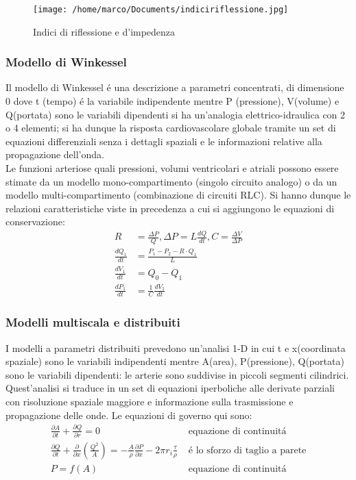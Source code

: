 \documentclass[10pt]{article}
\begin{document}
\begin{figure}[h!]
\centering
\texttt{[image: /home/marco/Documents/indiciriflessione.jpg]}
\caption{Indici di riflessione e d'impedenza}
\label{fig:indiciRIRM}
\end{figure}

\subsubsection{Modello di Winkessel}

Il modello di Winkessel é una descrizione a parametri concentrati, di dimensione 0 dove t (tempo) é la variabile indipendente mentre P (pressione), V(volume) e Q(portata) sono le variabili dipendenti \textrightarrow si ha un'analogia elettrico-idraulica con 2 o 4 elementi; si ha dunque la risposta cardiovascolare globale tramite un set di equazioni differenziali senza i dettagli spaziali e le informazioni relative alla propagazione dell'onda. \\
Le funzioni arteriose quali pressioni, volumi ventricolari e atriali possono essere stimate da un modello mono-compartimento (singolo circuito analogo) o da un modello multi-compartimento (combinazione di circuiti RLC).
Si hanno dunque le relazioni caratteristiche viste in precedenza a cui si aggiungono le equazioni di conservazione:
\begin{align*}
R &=\frac{\Delta P}{Q}, \Delta P=L\frac{dQ}{dt}, C=\frac{\Delta V}{\Delta P} \\
\frac{dQ_1}{dt} & =\frac{P_1-P_2-R \cdot Q_1}{L} \\
\frac{dV_1}{dt} & =Q_0-Q_1 \\
\frac{dP_1}{dt} & =\frac{1}{C}\frac{dV_1}{dt}
\end{align*}

\subsubsection{Modelli multiscala e distribuiti}

I modelli a parametri distribuiti prevedono un'analisi  1-D in cui t e x(coordinata spaziale) sono le variabili indipendenti mentre A(area), P(pressione), Q(portata) sono le variabili dipendenti: le arterie sono suddivise in piccoli segmenti cilindrici.\\
Quest'analisi si traduce in un set di equazioni iperboliche alle derivate parziali con risoluzione spaziale maggiore e informazione sulla trasmissione e propagazione delle onde. 
Le equazioni di governo qui sono:
\begin{align*}
\frac{\partial A}{\partial t}+ \frac{\partial Q}{\partial r}=0 &\text{ equazione di continuitá}\\
\frac{\partial Q}{\partial t}+ \frac{\partial}{\partial x}(\frac{Q^2}{A})=-\frac{A}{\rho} \frac{\partial P}{\partial x} -2 \pi r_i \frac{\tau}{\rho} &\text{ é lo sforzo di taglio a parete} \\
P= f(A) &\text{ equazione di continuitá}
\end{align*}
\end{document}
